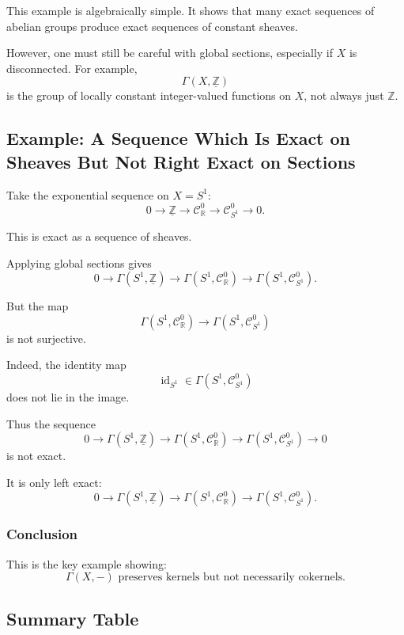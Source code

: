 \documentclass[12pt,a4paper]{article}
\DeclareMathOperator{\id}{id}
\newcommand{\RR}{\mathbb{R}}
\newcommand{\ZZ}{\mathbb{Z}}
\newcommand{\Czero}{\mathcal C^0}        %
\theoremstyle{notespace}
\newcommand{\SSone}{S^1}
\begin{document}
This example is algebraically simple. It shows that many exact sequences of abelian groups produce exact sequences of constant sheaves.

However, one must still be careful with global sections, especially if \(X\) is disconnected. For example,
\[
\Gamma(X,\underline{\ZZ})
\]
is the group of locally constant integer-valued functions on \(X\), not always just \(\ZZ\).

\subsection{Example: A Sequence Which Is Exact on Sheaves But Not Right Exact on Sections}

Take the exponential sequence on \(X=\SSone\):
\[
0\to \underline{\ZZ}
\to \Czero_{\RR}
\to \Czero_{\SSone}
\to 0.
\]

This is exact as a sequence of sheaves.

Applying global sections gives
\[
0\to \Gamma(\SSone,\underline{\ZZ})
\to \Gamma(\SSone,\Czero_{\RR})
\to \Gamma(\SSone,\Czero_{\SSone}).
\]

But the map
\[
\Gamma(\SSone,\Czero_{\RR})
\to
\Gamma(\SSone,\Czero_{\SSone})
\]
is not surjective.

Indeed, the identity map
\[
\id_{\SSone}\in \Gamma(\SSone,\Czero_{\SSone})
\]
does not lie in the image.

Thus the sequence
\[
0\to \Gamma(\SSone,\underline{\ZZ})
\to \Gamma(\SSone,\Czero_{\RR})
\to \Gamma(\SSone,\Czero_{\SSone})
\to 0
\]
is not exact.

It is only left exact:
\[
0\to \Gamma(\SSone,\underline{\ZZ})
\to \Gamma(\SSone,\Czero_{\RR})
\to \Gamma(\SSone,\Czero_{\SSone}).
\]

\subsubsection*{Conclusion}

This is the key example showing:
\[
\boxed{
	\Gamma(X,-)\text{ preserves kernels but not necessarily cokernels.}
}
\]

\subsection{Summary Table}
\end{document}
